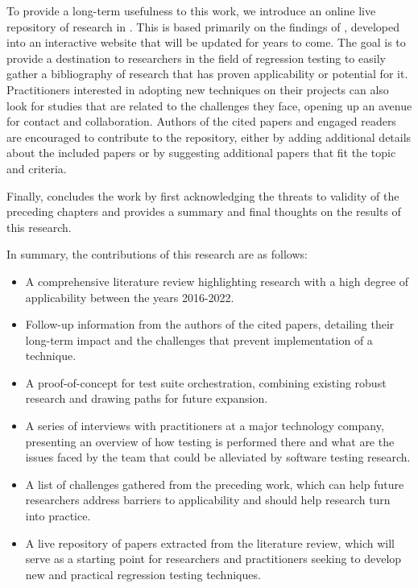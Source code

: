 To provide a long-term usefulness to this work, we introduce an online live repository of research in .
This is based primarily on the findings of , developed into an interactive website that will be updated for years to come.
The goal is to provide a destination to researchers in the field of regression testing to easily gather a bibliography of research that has proven applicability or potential for it.
Practitioners interested in adopting new techniques on their projects can also look for studies that are related to the challenges they face, opening up an avenue for contact and collaboration.
Authors of the cited papers and engaged readers are encouraged to contribute to the repository, either by adding additional details about the included papers or by suggesting additional papers that fit the topic and criteria.

Finally,  concludes the work by first acknowledging the threats to validity of the preceding chapters and provides a summary and final thoughts on the results of this research.

In summary, the contributions of this research are as follows:
\begin{itemize}
	\item A comprehensive literature review highlighting research with a high degree of applicability between the years 2016-2022.
	\item Follow-up information from the authors of the cited papers, detailing their long-term impact and the challenges that prevent implementation of a technique.
	\item A proof-of-concept for test suite orchestration, combining existing robust research and drawing paths for future expansion.
	\item A series of interviews with practitioners at a major technology company, presenting an overview of how testing is performed there and what are the issues faced by the team that could be alleviated by software testing research.
	\item A list of challenges gathered from the preceding work, which can help future researchers address barriers to applicability and should help research turn into practice.
	\item A live repository of papers extracted from the literature review, which will serve as a starting point for researchers and practitioners seeking to develop new and practical regression testing techniques. 
\end{itemize}



